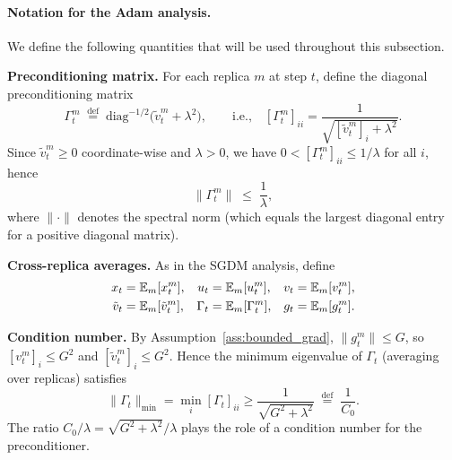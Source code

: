 \documentclass{article}
\begin{document}
\paragraph{Notation for the Adam analysis.}
We define the following quantities that will be used throughout this subsection.

\medskip
\noindent\textbf{Preconditioning matrix.}
For each replica $m$ at step $t$, define the diagonal preconditioning matrix
\begin{equation}
\Gamma_t^m \;\stackrel{\text{def}}{=}\;
\mathrm{diag}^{-1/2}\!\bigl(\tilde{v}_t^m + \lambda^2\bigr),
\qquad\text{i.e.,}\quad
[\Gamma_t^m]_{ii} = \frac{1}{\sqrt{[\tilde{v}_t^m]_i + \lambda^2}}.
\label{eq:adam_gamma_def}
\end{equation}
Since $\tilde{v}_t^m \geq 0$ coordinate-wise and $\lambda > 0$, we have
$0 < [\Gamma_t^m]_{ii} \leq 1/\lambda$ for all $i$, hence
\begin{equation}
\|\Gamma_t^m\| \;\leq\; \frac{1}{\lambda},
\label{eq:gamma_upper}
\end{equation}
where $\|\cdot\|$ denotes the spectral norm (which equals the largest diagonal
entry for a positive diagonal matrix).

\medskip
\noindent\textbf{Cross-replica averages.}
As in the SGDM analysis, define
\begin{align}
x_t &= \mathbb{E}_m[x_t^m], &
u_t &= \mathbb{E}_m[u_t^m], &
v_t &= \mathbb{E}_m[v_t^m], \notag \\
\tilde{v}_t &= \mathbb{E}_m[\tilde{v}_t^m], &
\Gamma_t &= \mathbb{E}_m[\Gamma_t^m], &
g_t &= \mathbb{E}_m[g_t^m].
\label{eq:adam_averages}
\end{align}

\medskip
\noindent\textbf{Condition number.}
By Assumption~\ref{ass:bounded_grad}, $\|g_t^m\| \leq G$, so
$[v_t^m]_i \leq G^2$ and $[\tilde{v}_t^m]_i \leq G^2$. Hence the
minimum eigenvalue of $\Gamma_t$ (averaging over replicas) satisfies
\begin{equation}
\|\Gamma_t\|_{\min}
= \min_i [\Gamma_t]_{ii}
\geq \frac{1}{\sqrt{G^2 + \lambda^2}}
\;\stackrel{\text{def}}{=}\; \frac{1}{C_0}.
\label{eq:C0_def}
\end{equation}
The ratio $C_0/\lambda = \sqrt{G^2 + \lambda^2}/\lambda$ plays the role of a
condition number for the preconditioner.
\end{document}
